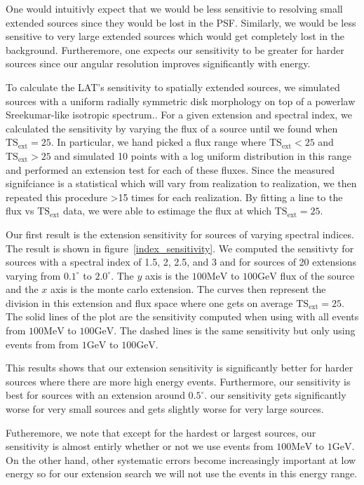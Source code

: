 \documentclass[preprint]{aastex}
\newcommand{\mev}{\text{MeV}}
\newcommand{\gev}{\text{GeV}}
\newcommand{\tsext}{\ensuremath{\text{TS}_\text{ext}}}
\begin{document}
One would intuitivly expect that we would be less sensitivie to resolving
small extended sources since they would be lost in the PSF.  Similarly,
we would be less sensitive to very large extended sources which would
get completely lost in the background. Furtheremore, one expects our
sensitivity to be greater for harder sources since our angular resolution
improves significantly with energy.

To calculate the LAT's sensitivity to spatially extended sources,
we simulated sources with a uniform radially symmetric
disk morphology on top of a powerlaw
Sreekumar-like isotropic spectrum.\cite{Sreekumar et al. ApJ 494 pag
523 1998}.  For a given extension and spectral index, we calculated the
sensitivity by varying the flux of a source until we found 
when $\tsext=25$. In particular, we hand picked a flux range
where $\tsext<25$ and $\tsext>25$ and simulated 10 points with
a log uniform distribution in this range and performed an extension
test for each of these fluxes. Since the measured signifciance is
a statistical which will vary from realization to realization,
we then repeated this procedure >15 times for each realization.
By fitting a line to the flux vs $\tsext$ data, we were able to
estimage the flux at which $\tsext=25$.

Our first result is the extension sensitivity for sources of varying
spectral indices. The result is shown in figure~\ref{index_sensitivity}.
We computed the sensitivty for sources with a spectral index of 1.5,
2, 2.5, and 3 and for sources of 20 extensions varying from $0.1^\circ$
to $2.0^\circ$. The $y$ axis is the $100\mev$ to $100\gev$ flux of the
source and the $x$ axis is the monte carlo extension. The curves then
represent the division in this extension and flux space where one gets
on average $\tsext=25$.
The solid lines of the plot are the sensitivity computed when using
with all events from $100\mev$ to $100\gev$. The dashed lines is the
same sensitivity but only using events from from $1\gev$ to $100\gev$.

This results shows that our extension sensitivity is
significantly better for harder sources where there are more high
energy events. Furthermore, our sensitivity is best for sources with an
extension around $0.5^\circ$.  our sensitivity gets significantly worse
for very small sources and gets slightly worse for very large sources.

Futheremore, we note that except for the hardest or largest sources,
our sensitivity is almost entirly whether or not we use events from
$100\mev$ to $1\gev$. On the other hand, other systematic errors become
increasingly important at low energy so for our extension search we will
not use the events in this energy range.
\end{document}

